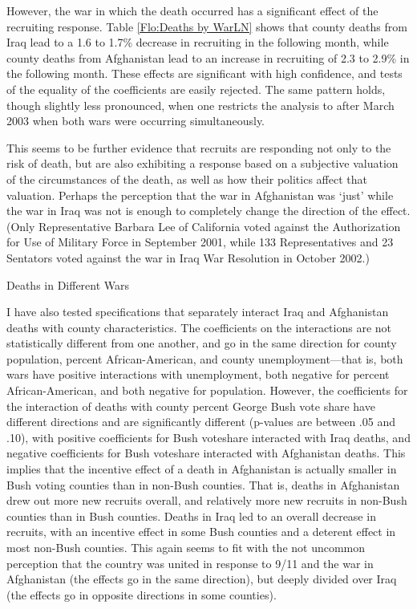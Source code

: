 \documentclass[12pt] {article}
\begin{document}
However, the war in which the death occurred has a significant effect of the recruiting response. Table \ref{Flo:Deaths by WarLN} shows that county deaths from Iraq lead to a 1.6 to 1.7\% decrease in recruiting in the following month, while county deaths from Afghanistan lead to an increase in recruiting of 2.3 to 2.9\% in the following month. 
These effects are significant with high confidence, and tests of the
equality of the coefficients are easily rejected. The same pattern holds, though slightly less pronounced, when one restricts the analysis to after March 2003 when both wars were occurring simultaneously. 

This seems to be further evidence that recruits are responding not only to the risk of death, but are also exhibiting a response based on a subjective valuation of the circumstances of the death, as well as how their politics affect that valuation. Perhaps the perception that the war in Afghanistan was `just' while the war in Iraq was not is enough to completely change the direction of the effect. (Only Representative Barbara Lee of California voted against the Authorization for Use of Military Force in September 2001, while 133 Representatives and 23 Sentators voted against the war in Iraq War Resolution in October 2002.)
\begin{table}
\caption{Deaths in Different Wars}
\label{Flo:Deaths by WarLN}
\scalebox{0.8}{

}
\end{table}

I have also tested specifications that separately interact Iraq and Afghanistan deaths with county characteristics. The coefficients on the interactions are not statistically different from one another, and go in the same direction for county population, percent African-American, and county unemployment---that is, both wars have positive interactions with unemployment, both negative for percent African-American, and both negative for population. However, the coefficients for the interaction of deaths with county percent George Bush vote share have different directions and are significantly different (p-values are between .05 and .10), with positive coefficients for Bush voteshare interacted with Iraq deaths, and negative coefficients for Bush voteshare interacted with Afghanistan deaths. This implies that the incentive effect of a death in Afghanistan is actually smaller in Bush voting counties than in non-Bush counties. That is, deaths in Afghanistan drew out more new recruits overall, and relatively more new recruits in non-Bush counties than in Bush counties. Deaths in Iraq led to an overall decrease in recruits, with an incentive effect in some Bush counties and a deterent effect in most non-Bush counties. This again seems to fit with the not uncommon perception that the country was united in response to 9/11 and the war in Afghanistan (the effects go in the same direction), but deeply divided over Iraq (the effects go in opposite directions in some counties). 
\end{document}

